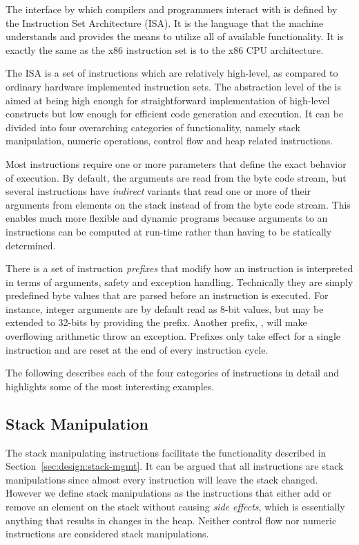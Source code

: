 The interface by which compilers and programmers interact with \thename{} is
defined by the Instruction Set Architecture (ISA). It is the language that the
machine understands and provides the means to utilize all of available
functionality. It is exactly the same as the x86 instruction set is to the x86
CPU architecture.

The \thename{} ISA is a set of instructions which are relatively high-level, as
compared to ordinary hardware implemented instruction sets. The abstraction
level of the \thename{} is aimed at being high enough for straightforward
implementation of high-level constructs but low enough for efficient code
generation and execution. It can be divided into four overarching categories of
functionality, namely stack manipulation, numeric operations, control flow and
heap related instructions.

Most instructions require one or more parameters that define the exact behavior
of execution. By default, the arguments are read from the byte code stream, but
several instructions have \emph{indirect} variants that read one or more of
their arguments from elements on the stack instead of from the byte code
stream. This enables much more flexible and dynamic programs because arguments
to an instructions can be computed at run-time rather than having to be
statically determined.

There is a set of instruction \emph{prefixes} that modify how an instruction is
interpreted in terms of arguments, safety and exception handling. Technically
they are simply predefined byte values that are parsed before an instruction is
executed. For instance, integer arguments are by default read as 8-bit values,
but may be extended to 32-bits by providing the  prefix. Another
prefix, , will make overflowing arithmetic throw an
exception. Prefixes only take effect for a single instruction and are reset at
the end of every instruction cycle.

The following describes each of the four categories of instructions in detail
and highlights some of the most interesting examples.

\subsection{Stack Manipulation}

The stack manipulating instructions facilitate the functionality described in
Section~\ref{sec:design:stack-mgmt}. It can be argued that all instructions are
stack manipulations since almost every instruction will leave the stack
changed. However we define stack manipulations as the instructions that either
add or remove an element on the stack without causing \textit{side effects},
which is essentially anything that results in changes in the heap. Neither
control flow nor numeric instructions are considered stack manipulations.

